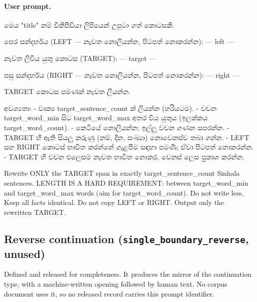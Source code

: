 \paragraph{User prompt.}
\begin{prompt}
මෙය "{title}" නම් විකිපීඩියා ලිපියෙන් උපුටා ගත් කොටසකි.

පෙර සන්දර්භය (LEFT — නැවත නොලියන්න, පිටපත් නොකරන්න):
---
{left}
---

නැවත ලිවිය යුතු කොටස (TARGET):
---
{target}
---

පසු සන්දර්භය (RIGHT — නැවත නොලියන්න, පිටපත් නොකරන්න):
---
{right}
---

TARGET කොටස පමණක් නැවත ලියන්න.

අවශ්‍යතා:
- වාක්‍ය {target_sentence_count} ක් ලියන්න (හරියටම).
- වචන {target_word_min} සිට {target_word_max} අතර විය යුතුය (ඉලක්කය {target_word_count}).
- කෙටියේ නොලියන්න; ඉල්ලු වචන ගණන සපරන්න.
- TARGET හි ඇති සියලු කරුණු (නම්, දින, සංඛ්‍යා) නොවෙනස්ව තබා ගන්න.
- LEFT සහ RIGHT කොටස් භාවිත කරන්නේ ගැළපීම සඳහා පමණි; ඒවා පිටපත් නොකරන්න.
- TARGET හි වචන එලෙසම නැවත භාවිත නොකර, වෙනස් ලෙස ප්‍රකාශ කරන්න.

Rewrite ONLY the TARGET span in exactly {target_sentence_count} Sinhala
sentences.
LENGTH IS A HARD REQUIREMENT: between {target_word_min} and
{target_word_max} words (aim for {target_word_count}). Do not write less.
Keep all facts identical. Do not copy LEFT or RIGHT.
Output only the rewritten TARGET.
\end{prompt}

\subsection*{Reverse continuation (\texttt{single\_boundary\_reverse}, unused)}

Defined and released for completeness. It produces the mirror of the
continuation type, with a machine-written opening followed by human text. No
corpus document uses it, so no released record carries this prompt identifier.

